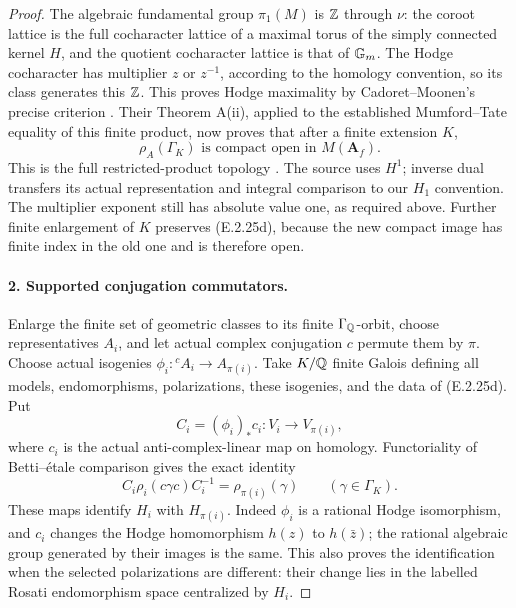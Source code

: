 \begin{proof}
The algebraic fundamental group \(\pi_1(M)\) is
\(\mathbb Z\) through \(\nu\): the coroot lattice is the
full cocharacter lattice of a maximal torus of the
simply connected kernel \(H\), and the quotient
cocharacter lattice is that of \(\mathbb G_m\). The Hodge
cocharacter has multiplier \(z\) or \(z^{-1}\),
according to the homology convention, so its class
generates this \(\mathbb Z\). This proves Hodge maximality
by Cadoret--Moonen's precise criterion
\cite[Sections 2.2--2.3, author p.~4]
{GenCadoretMoonen2020}. Their Theorem A(ii), applied
to the established Mumford--Tate equality of this
finite product, now proves that after a finite
extension \(K\),
\[
 \rho_A(\Gamma_K)\text{ is compact open in }M(\mathbf A_f).
 \tag{E.2.25d}
\]
This is the full restricted-product topology
\cite[Theorem A(ii), author p.~2; Theorem 5.3 and
proof, author pp.~11--12]{GenCadoretMoonen2020}.
The source uses \(H^1\); inverse dual transfers its
actual representation and integral comparison to our
\(H_1\) convention. The multiplier exponent still has
absolute value one, as required above. Further finite
enlargement of \(K\) preserves (E.2.25d), because the
new compact image has finite index in the old one and
is therefore open.

\paragraph{2. Supported conjugation commutators.}
Enlarge the finite set of geometric classes to its
finite \(\Gamma_\mathbb Q\)-orbit, choose representatives
\(A_i\), and let actual complex conjugation \(c\)
permute them by \(\pi\). Choose actual isogenies
\(\phi_i:{}^c A_i\to A_{\pi(i)}\). Take \(K/\mathbb Q\)
finite Galois defining all models, endomorphisms,
polarizations, these isogenies, and the data of
(E.2.25d). Put
\[
 C_i=(\phi_i)_*c_i:V_i\longrightarrow V_{\pi(i)},
\]
where \(c_i\) is the actual anti-complex-linear
map on homology. Functoriality of Betti--\'etale
comparison gives the exact identity
\[
 C_i\rho_i(c\gamma c)C_i^{-1}
          =\rho_{\pi(i)}(\gamma)
                  \qquad(\gamma\in\Gamma_K).
 \tag{E.2.25e}
\]
These maps identify \(H_i\) with \(H_{\pi(i)}\).
Indeed \(\phi_i\) is a rational Hodge isomorphism,
and \(c_i\) changes the Hodge homomorphism \(h(z)\)
to \(h(\bar z)\); the rational algebraic group
generated by their images is the same. This also
proves the identification when the selected
polarizations are different: their change lies in
the labelled Rosati endomorphism space centralized
by \(H_i\).


\end{proof}
